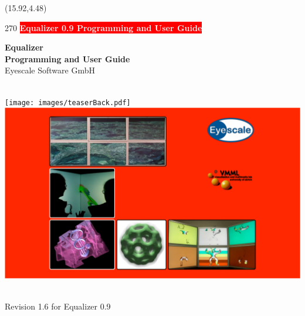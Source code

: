 \documentclass[10pt]{scrartcl}
\newcommand{\boxwidth}{5in}
\newcommand{\spacewidth}{604pt}
\begin{document}
\thispagestyle{empty}

\begin{textblock}{}(15.92,4.48)
  \begin{rotate}{270}
    \colorbox{red}{\textsf{\bfseries\Large\textcolor{white}{
          \hspace{.96cm}Equalizer 0.9 Programming and User Guide\hspace{.96cm}}}}
  \end{rotate}
\end{textblock}

\vfill
\parbox[t]{\spacewidth}{\hfill}
\parbox[t]{\boxwidth}{
  \center
  \textsf{\textbf{\huge Equalizer\\Programming and User Guide}}\\[\bigskipamount]
  {\Large Eyescale Software GmbH}
}\\
\vfill
\hspace{-128pt}
  \texttt{[image: images/teaserBack.pdf]}
  \hspace{11pt}
  \includegraphics[width=604pt]{images/teaser.pdf}
\\
\vfill
\parbox[t]{\spacewidth}{\hfill}
\parbox[t]{\boxwidth}{ \\\vspace{1cm}
  {\Large Revision 1.6 for Equalizer 0.9}\\[\medskipamount]
}
\end{document}
